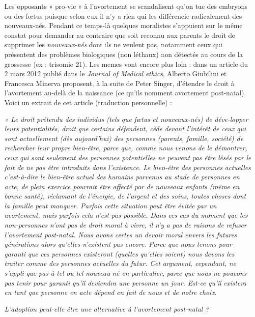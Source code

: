  Les opposants « pro-vie » à l'avortement se scandalisent qu'on tue des embryons ou des fœtus puisque selon eux il n'y a rien qui les différencie radicalement des nouveaux-nés. Pendant ce temps-là quelques moralistes s'appuient sur  le même constat pour demander au contraire que soit reconnu aux parents le droit de supprimer les \emph{nouveaux-nés} dont ils ne veulent pas, notamment ceux qui présentent des problèmes biologiques (non léthaux) non détectés au cours de la grossesse (ex : trisomie 21). Les memes vont encore plus loin : dans un article du 2 mars 2012 publié dans le \emph{Journal of Medical ethics}, Alberto Giubilini et Francesca Minerva proposent, à la suite de Peter Singer, d'étendre le droit à l'avortement au-delà de la naissance (ce qu'ils nomment avortement post-natal). Voici un extrait de cet article (traduction personnelle) :
 \begin{displayquote}
\emph{« Le droit prétendu des individus (tels que fœtus et nouveaux-nés) de déve-lopper leurs potentialités, droit que certains défendent, cède devant l'intérêt de ceux qui sont actuellement (dès aujourd'hui) des personnes (parents, famille, société) de rechercher leur propre bien-être, parce que, comme nous venons de le démontrer, ceux qui sont seulement des personnes potentielles ne peuvent pas être lésés par le fait de ne pas être introduits dans l'existence. Le bien-être des personnes actuelles c'est-à-dire le bien-être actuel des humains parvenus au stade de personnes en acte, de plein exercice  pourrait être affecté par de nouveaux enfants (même en bonne santé), réclamant de l'énergie, de l'argent et des soins, toutes choses dont la famille peut manquer. Parfois cette situation peut être évitée par un avortement, mais parfois cela n'est pas possible. Dans ces cas du moment que les non-personnes n'ont pas de droit moral à vivre, il n'y a pas de raisons de refuser l'avortement post-natal. Nous avons certes un devoir moral envers les futures générations alors qu'elles n'existent pas encore. Parce que nous tenons pour garanti que ces personnes existeront (quelles qu'elles soient) nous devons les traiter comme des personnes actuelles du futur. Cet argument, cependant, ne s'appli-que pas à tel ou tel nouveau-né en particulier, parce que nous ne pouvons pas tenir pour garanti qu'il deviendra une personne un jour. Est-ce qu'il existera  en tant que personne en acte  dépend en fait de nous et de notre choix.}

\emph{L'adoption peut-elle être une alternative à l'avortement post-natal ?}


\end{displayquote}
